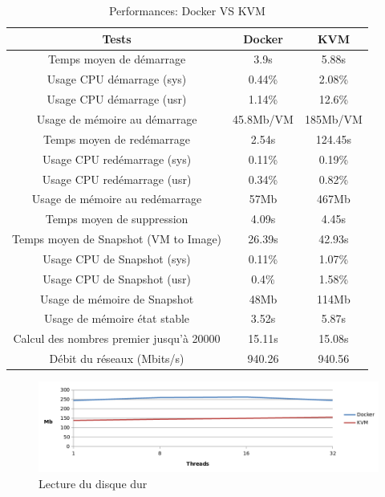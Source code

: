 \begin{onehalfspace}
{\begin{center}
\begin{table}[H]
	\begin{tabular}{| c | c | c |} 

	\hline
	\rowcolor{tabHead}
	\textbf{Tests} & \textbf{Docker} & \textbf{KVM}\\
	\hline\hline
	Temps moyen de démarrage 					& 3.9s 				& 	5.88s \\ 
	Usage CPU démarrage (sys)					& 0.44\%			& 	2.08\% \\ 
	Usage CPU démarrage (usr)					& 1.14\% 			& 	12.6\% \\ 
	Usage de mémoire au démarrage				& 45.8Mb/VM 		& 	185Mb/VM \\ 

	Temps moyen de redémarrage 					& 2.54s 			& 	124.45s \\ 
	Usage CPU redémarrage (sys)					& 0.11\% 			& 	0.19\% \\ 
	Usage CPU redémarrage (usr)					& 0.34\% 			& 	0.82\% \\ 
	Usage de mémoire au redémarrage				& 57Mb	 			& 	467Mb	  \\ 

	Temps moyen de suppression 					& 4.09s 			& 	4.45s \\ 

	Temps moyen de Snapshot (VM to Image) 		& 26.39s 			& 	42.93s \\ 
	Usage CPU de Snapshot (sys)			 		& 0.11\% 			& 	1.07\% \\ 
	Usage CPU de Snapshot (usr)			 		& 0.4\% 			& 	1.58\% \\ 
	Usage de mémoire de Snapshot		 		& 48Mb 				& 	114Mb \\ 

	Usage de mémoire état stable				& 3.52s 			& 	5.87s \\ 

	Calcul des nombres premier jusqu'à 20000	& 15.11s 			& 	15.08s \\ 

	Débit du réseaux (Mbits/s)					& 940.26 			& 	940.56 \\ 
	\hline
	\end{tabular}
	\caption{Performances: Docker VS KVM }
	\label{tab:table_label}
\end{table}
\end{center}
}


\begin{figure}[H]
\centering
\includegraphics [width=160mm]{chapitre2/assets/file-io-read.png}
\caption{Lecture du disque dur}
\label{fig:}
\end{figure}


\end{onehalfspace}
